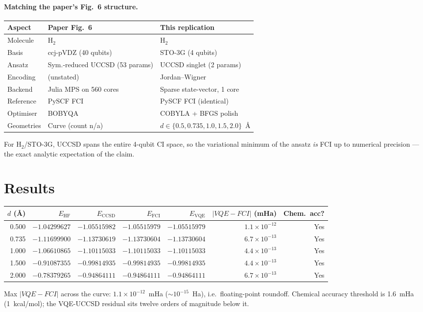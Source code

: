 \documentclass[11pt]{article}
\begin{document}
\paragraph{Matching the paper's Fig.~6 structure.}
\begin{longtable}{@{}p{}p{}p{}@{}}
\toprule
Aspect & Paper Fig.~6 & This replication \\ \midrule
Molecule & H$_2$ & H$_2$ \\
Basis & ccj-pVDZ (40 qubits) & STO-3G (4 qubits) \\
Ansatz & Sym.-reduced UCCSD (53 params) & UCCSD singlet (2 params) \\
Encoding & (unstated) & Jordan--Wigner \\
Backend & Julia MPS on 560 cores & Sparse state-vector, 1 core \\
Reference & PySCF FCI & PySCF FCI (identical) \\
Optimiser & BOBYQA & COBYLA + BFGS polish \\
Geometries & Curve (count n/a) & $d \in \{0.5, 0.735, 1.0, 1.5, 2.0\}$~\AA{} \\
\bottomrule
\end{longtable}

For H$_2$/STO-3G, UCCSD spans the entire 4-qubit CI space, so the
variational minimum of the ansatz \emph{is} FCI up to numerical
precision --- the exact analytic expectation of the claim.

\section{Results}
\begin{longtable}{@{}rrrrrrr@{}}
\toprule
$d$ (\AA) & $E_{\text{HF}}$ & $E_{\text{CCSD}}$ & $E_{\text{FCI}}$ & $E_{\text{VQE}}$ & $|VQE-FCI|$ (mHa) & Chem.\ acc? \\ \midrule
0.500 & $-1.04299627$ & $-1.05515982$ & $-1.05515979$ & $-1.05515979$ & $1.1\times10^{-12}$ & Yes \\
0.735 & $-1.11699900$ & $-1.13730619$ & $-1.13730604$ & $-1.13730604$ & $6.7\times10^{-13}$ & Yes \\
1.000 & $-1.06610865$ & $-1.10115033$ & $-1.10115033$ & $-1.10115033$ & $4.4\times10^{-13}$ & Yes \\
1.500 & $-0.91087355$ & $-0.99814935$ & $-0.99814935$ & $-0.99814935$ & $4.4\times10^{-13}$ & Yes \\
2.000 & $-0.78379265$ & $-0.94864111$ & $-0.94864111$ & $-0.94864111$ & $6.7\times10^{-13}$ & Yes \\
\bottomrule
\end{longtable}
Max $|VQE - FCI|$ across the curve: $1.1\times10^{-12}$~mHa
($\sim 10^{-15}$~Ha), i.e.\ floating-point roundoff. Chemical
accuracy threshold is 1.6~mHa (1~kcal/mol); the VQE-UCCSD residual
sits twelve orders of magnitude below it.
\end{document}
